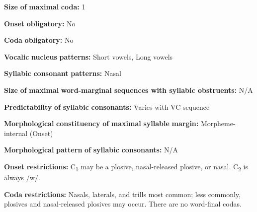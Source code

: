 \begin{styleBody}
\textbf{Size} \textbf{of} \textbf{maximal} \textbf{coda:} 1
\end{styleBody}

\begin{styleBody}
\textbf{Onset} \textbf{obligatory:} No
\end{styleBody}

\begin{styleBody}
\textbf{Coda} \textbf{obligatory:} No
\end{styleBody}

\begin{styleBody}
\textbf{Vocalic} \textbf{nucleus} \textbf{patterns:} Short vowels, Long vowels
\end{styleBody}

\begin{styleBody}
\textbf{Syllabic} \textbf{consonant} \textbf{patterns:} Nasal
\end{styleBody}

\begin{styleBody}
\textbf{Size} \textbf{of} \textbf{maximal} \textbf{word{}-marginal sequences with syllabic obstruents:} N/A
\end{styleBody}

\begin{styleBody}
\textbf{Predictability} \textbf{of} \textbf{syllabic} \textbf{consonants:} Varies with VC sequence
\end{styleBody}

\begin{styleBody}
\textbf{Morphological} \textbf{constituency} \textbf{of} \textbf{maximal} \textbf{syllable} \textbf{margin:} Morpheme-internal (Onset)
\end{styleBody}

\begin{styleBody}
\textbf{Morphological} \textbf{pattern} \textbf{of} \textbf{syllabic} \textbf{consonants:} N/A
\end{styleBody}

\begin{styleBody}
\textbf{Onset} \textbf{restrictions:} C\textsubscript{1} may be a plosive, nasal-released plosive, or nasal. C\textsubscript{2} is always /w/.
\end{styleBody}

\begin{styleBody}
\textbf{Coda} \textbf{restrictions:} Nasals, laterals, and trills most common; less commonly, plosives and nasal-released plosives may occur. There are no word-final codas.
\end{styleBody}

